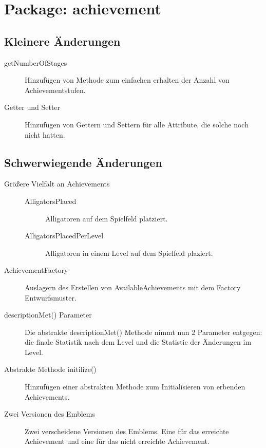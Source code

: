 \section{Package: achievement}

\subsection{Kleinere Änderungen}

	\begin{description}
		\item[getNumberOfStages]
		Hinzufügen von Methode zum einfachen erhalten der Anzahl von Achievementstufen.
		\item[Getter und Setter]
		Hinzufügen von Gettern und Settern für alle Attribute, die solche noch nicht hatten.

	\end{description}

\subsection{Schwerwiegende Änderungen}

	\begin{description}
		\item[Größere Vielfalt an Achievements]
		\begin {description}
			\item[AlligatorsPlaced]
			Alligatoren auf dem Spielfeld platziert.
			\item[AlligatorsPlacedPerLevel]
			Alligatoren in einem Level auf dem Spielfeld plaziert.
		\end {description}

		\item[AchievementFactory]
		Auslagern des Erstellen von AvailableAchievements mit dem Factory Entwurfsmuster.
		
		\item[descriptionMet() Parameter]	
		Die abstrakte descriptionMet() Methode nimmt nun 2 Parameter entgegen: die finale Statistik nach dem Level und die Statistic der Änderungen im Level.		

		\item[Abstrakte Methode initilize()]
		Hinzufügen einer abstrakten Methode zum Initialisieren von erbenden Achievements.

		\item[Zwei Versionen des Emblems]
		Zwei verscheidene Versionen des Emblems. Eine für das erreichte Achievement und eine für das nicht erreichte Achievement.

	\end{description}
